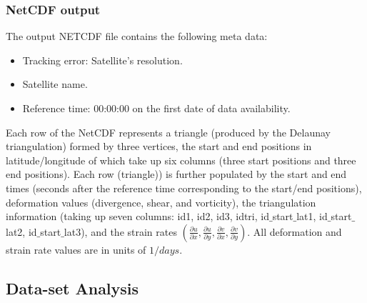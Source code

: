 \documentclass{article}
\newcommand{\ode}[2]{\frac{\partial #1}{\partial #2}}
\begin{document}
        \subsubsection{NetCDF output}

            The output NETCDF file contains the following meta data:
            \begin{itemize}
                \item Tracking error: Satellite's resolution.
                \item Satellite name.
                \item Reference time: 00:00:00 on the first date of data availability.
            \end{itemize}
            Each row of the NetCDF represents a triangle (produced by the Delaunay triangulation) formed by three vertices, the start and end positions in latitude/longitude of which take up six columns (three start positions and three end positions). Each row (triangle)) is further populated by the start and end times (seconds after the reference time corresponding to the start/end positions), deformation values (divergence, shear, and vorticity), the triangulation information (taking up seven columns: id1, id2, id3, idtri, id$\_$start$\_$lat1, id$\_$start$\_$lat2, id$\_$start$\_$lat3), and the strain rates $\left(\ode{u}{x},\ode{u}{y},\ode{v}{x},\ode{v}{y}\right)$. All deformation and strain rate values are in units of $1/days$.

    \subsection{Data-set Analysis}\label{structure}
\end{document}
